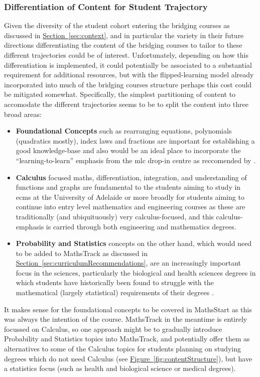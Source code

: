 \documentclass[twoside,12pt,a4paper]{report}
\newcommand{\refsec}[1]{\hyperref[sec:#1]{Section~\ref{sec:#1}}}
\newcommand{\reffig}[1]{\hyperref[fig:#1]{Figure~\ref{fig:#1}}}
\begin{document}
\subsubsection{Differentiation of Content for Student Trajectory}

Given the diversity of the student cohort entering the bridging courses as discussed in \refsec{context}, and in particular the variety in their future directions differentiating the content of the bridging courses to tailor to these different trajectories could be of interest. Unfortunately, depending on how this differentiation is implemented, it could potentially be associated to a substantial requirement for additional resources, but with the flipped-learning model already incorporated into much of the bridging courses structure perhaps this cost could be mitigated somewhat. Specifically, the simplest partitioning of content to accomodate the different trajectories seems to be to split the content into three broad areas:
\begin{itemize}
	\item \textbf{Foundational Concepts} such as rearranging equations, polynomials (quadratics mostly), index laws and fractions are important for establishing a good knowledge-base and also would be an ideal place to incorporate the ``learning-to-learn'' emphasis from the \gls{mlc} drop-in centre as reccomended by . 
	\item \textbf{Calculus} focused maths, differentiation, integration, and understanding of functions and graphs are fundamental to the students aiming to study in \gls{ecms} at the University of Adelaide or more broadly for students aiming to continue into entry level mathematics and engineering courses as these are traditionally (and ubiquituously) very calculus-focused, and this calculus-emphasis is carried through both engineering and mathematics degrees. 
	\item \textbf{Probability and Statistics} concepts on the other hand, which would need to be added to MathsTrack as discussed in \refsec{curriculumRecommendations}, are an increasingly important focus in the sciences, particularly the biological and health sciences degrees in which students have historically been found to struggle with the mathematical (largely statistical) requirements of their degrees \cite{Tariq2002}. 
\end{itemize}
It makes sense for the foundational concepts to be covered in MathsStart as this was always the intention of the course. MathsTrack in the meantime is entirely focussed on Calculus, so one approach might be to gradually introduce Probability and Statistics topics into MathsTrack, and potentially offer them as alternatives to some of the Calculus topics for students planning on studying degrees which do not need Calculus (see \reffig{contentStructure}), but have a statistics focus (such as health and biological science or medical degrees).
\end{document}
